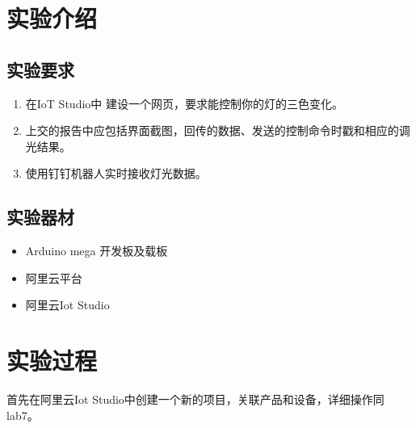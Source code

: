 \documentclass[12pt,hyperref,a4paper,UTF8]{ctexart}
\begin{document}
\cover

%
%

\thispagestyle{empty} %

\newpage
\tableofcontents

\newpage


\section{实验介绍}
\subsection{实验要求}

\begin{enumerate}
  \item 在IoT Studio中 建设一个网页，要求能控制你的灯的三色变化。
  \item 上交的报告中应包括界面截图，回传的数据、发送的控制命令时戳和相应的调光结果。
  \item 使用钉钉机器人实时接收灯光数据。
\end{enumerate}
\subsection{实验器材}
\begin{itemize}[itemsep=-5pt, topsep=0pt, partopsep=0pt]
    \item Arduino mega 开发板及载板
    \item 阿里云平台
    \item 阿里云Iot Studio
\end{itemize}


\section{实验过程}

\noindent 首先在阿里云Iot Studio中创建一个新的项目，关联产品和设备，详细操作同lab7。
\end{document}

